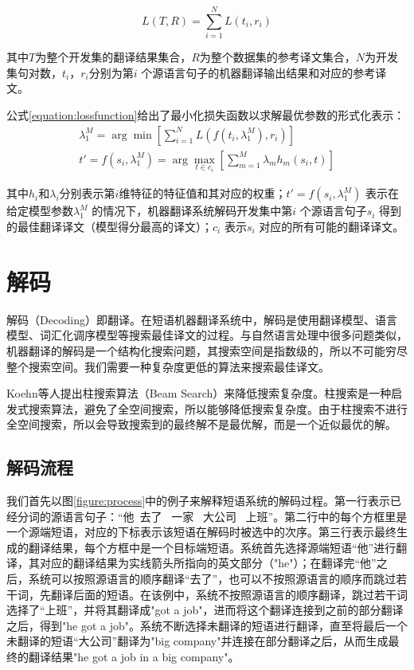 \documentclass[master, winfont]{njuthesis}
\begin{document}
\begin{equation}
  \label{equation:mertloss}
  L(T,R)=\sum_{i=1}^NL(t_i, r_i)
\end{equation}

其中$T$为整个开发集的翻译结果集合，$R$为整个数据集的参考译文集合，$N$为开发集句对数，$t_i$，$r_i$分别为第$i$ 个源语言句子的机器翻译输出结果和对应的参考译文。

公式\ref{equation:lossfunction}给出了最小化损失函数以求解最优参数的形式化表示：
\begin{equation}
  \label{equation:lossfunction}
  \begin{aligned}
    \lambda_1^M=\arg\min[\sum_{i=1}^NL(f(t_i,\lambda_1^M), r_i)]\\
    t'=f(s_i,\lambda_1^M)=\arg\max_{t\in c_i}[\sum_{m=1}^M\lambda_mh_m(s_i,t)]
  \end{aligned}
\end{equation}

其中$h_i$和$\lambda_i$分别表示第$i$维特征的特征值和其对应的权重；$t'=f(s_i,\lambda_1^M)$ 表示在给定模型参数$\lambda_1^M$ 的情况下，机器翻译系统解码开发集中第$i$ 个源语言句子$s_i$ 得到的最佳翻译译文（模型得分最高的译文）；$c_i$ 表示$s_i$ 对应的所有可能的翻译译文。

\section{解码}
\label{section:decodeMethod}
解码（Decoding）即翻译。在短语机器翻译系统中，解码是使用翻译模型、语言模型、词汇化调序模型等搜索最佳译文的过程。与自然语言处理中很多问题类似，机器翻译的解码是一个结构化搜索问题，其搜索空间是指数级的，所以不可能穷尽整个搜索空间。我们需要一种复杂度更低的算法来搜索最佳译文。

Koehn等人\cite{koehn2009statistical}提出柱搜索算法（Beam Search）来降低搜索复杂度。柱搜索是一种启发式搜索算法，避免了全空间搜索，所以能够降低搜索复杂度。由于柱搜索不进行全空间搜索，所以会导致搜索到的最终解不是最优解，而是一个近似最优的解。

\subsection{解码流程}\label{section:decode}
我们首先以图\ref{figure:process}中的例子来解释短语系统的解码过程。第一行表示已经分词的源语言句子：“他~去了~ 一家~ 大公司~ 上班”。第二行中的每个方框里是一个源端短语，对应的下标表示该短语在解码时被选中的次序。第三行表示最终生成的翻译结果，每个方框中是一个目标端短语。系统首先选择源端短语“他”进行翻译，其对应的翻译结果为实线箭头所指向的英文部分（"he"）；在翻译完“他”之后，系统可以按照源语言的顺序翻译“去了”，也可以不按照源语言的顺序而跳过若干词，先翻译后面的短语。在该例中，系统不按照源语言的顺序翻译，跳过若干词选择了“上班”，并将其翻译成"got a job"，进而将这个翻译连接到之前的部分翻译之后，得到"he got a job"。系统不断选择未翻译的短语进行翻译，直至将最后一个未翻译的短语“大公司”翻译为"big company"并连接在部分翻译之后，从而生成最终的翻译结果"he got a job in a big company"。
\end{document}
